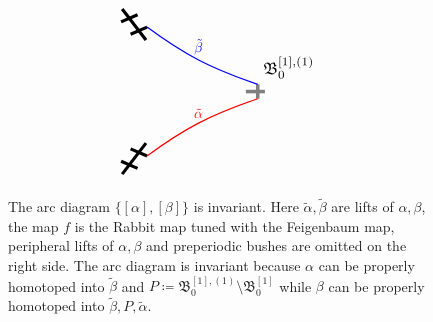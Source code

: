 \documentclass{amsart}
\newcommand{\bush}{{\mathfrak B }}
\newcommand{\1}{{\mathbb 1 }}
\begin{document}
\begin{figure}[t!]
\[\begin{tikzpicture}[xscale=2,yscale=1.5]
\begin{scope}[shift={(4.5,0)}]
\begin{scope}[rotate =0,shift={(1.3,0)},scale=-0.6]
\draw[line width=0.9mm,gray] (0.5,0) -- (0.9,0); 
\draw[line width=0.9mm,gray] (0.65,-0.2) -- (0.65,0.2); 

\coordinate (ra1) at (0.65,-0.2) ;
\coordinate (ra0) at (0.65,0.2) ;

\node[above,scale=1.2] at(0,-0.2){$\bush^{[1],(1)}_0$};


  \end{scope}
  
  \begin{scope}[rotate =120,shift={(1.3,0)}, scale=0.6]
\draw[line width=0.8mm] (-0.5,0)--(0.5,0); 
\draw[line width=0.8mm] (-0.2,-0.2)--(-0.2,0.2);
\draw[line width=0.8mm] (0.2,-0.2)--(0.2,0.2);

\coordinate (rb1) at (-0.2,0.2);
\coordinate (rb0) at (-0.2,-0.2);
  \end{scope}
  
   
  \begin{scope}[rotate =240,shift={(1.3,0)}, scale=0.6]
\draw[line width=0.8mm] (-0.5,0)--(0.5,0); 
\draw[line width=0.8mm] (-0.2,-0.2)--(-0.2,0.2);
\draw[line width=0.8mm] (0.2,-0.2)--(0.2,0.2);

\coordinate (rc1) at (-0.2,0.2);
\coordinate (rc0) at (-0.2,-0.2);
  \end{scope}



\draw[line width=0.3mm, red] (rc1) edge[bend left=10] node[above] {$\tilde \alpha$} (ra0);

 \draw[line width=0.3mm, blue] (rb0) edge[bend right=10] node[above] {$\tilde \beta$}  (ra1);


\end{scope}
\end{tikzpicture}\]


\caption{The arc diagram $\{[\alpha], [\beta]\}$ is invariant. Here $\widetilde \alpha, \widetilde \beta$ are lifts of $\alpha,\beta$, the map $f$ is the Rabbit map tuned with the Feigenbaum map, peripheral lifts of $\alpha,\beta$ and preperiodic bushes are omitted on the right side. The arc diagram is invariant because $\alpha$ can be properly homotoped into $\widetilde \beta$ and $P\coloneqq \bush^{[1],(1)}_0\setminus \bush^{[1]}_0$ while $\beta$ can be properly homotoped into $\widetilde \beta, P, \widetilde \alpha$.}

\label{Fig:exm Inv Arc Diagr}
\end{figure}
\end{document}
